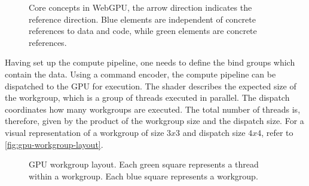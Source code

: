 \begin{figure}[H]
  \centering
  \caption{Core concepts in \gls{WebGPU}, the arrow direction indicates the reference direction. Blue elements are independent of concrete references to data and code, while green elements are concrete references.}
  \label{fig:webgpu-arch}
\end{figure}

Having set up the compute pipeline, one needs to define the bind groups which contain the data. Using a command encoder, the compute pipeline can be dispatched to the \gls{GPU} for execution. The shader describes the expected size of the workgroup, which is a group of threads executed in parallel. The dispatch coordinates how many workgroups are executed. The total number of threads is, therefore, given by the product of the workgroup size and the dispatch size. For a visual representation of a workgroup of size $3x3$ and dispatch size $4x4$, refer to \autoref{fig:gpu-workgroup-layout}.

\begin{figure}[H]
  \centering
  \caption{\gls{GPU} workgroup layout. Each green square represents a thread within a workgroup. Each blue square represents a workgroup.}
  \label{fig:gpu-workgroup-layout}
\end{figure}

